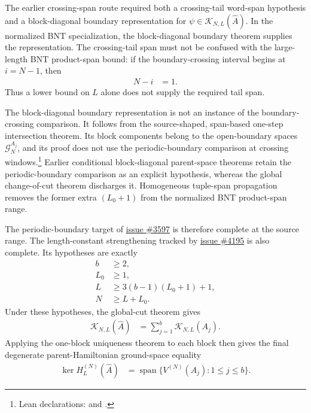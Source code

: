 \documentclass{article}
\begin{document}
The earlier crossing-span route required both a crossing-tail word-span
hypothesis and a block-diagonal boundary representation for
$\psi\in\mathcal K_{N,L}(\widehat A)$. In the normalized BNT specialization,
the block-diagonal boundary theorem supplies the representation. The
crossing-tail span must not be confused with the large-length BNT product-span
bound: if the boundary-crossing interval begins at $i=N-1$, then
\begin{align}
  N-i
    &=
    1.
  \label{eq:cpgsv21_block_diagonal_parent_ground_space_short_crossing_tail}
\end{align}
Thus a lower bound on $L$ alone does not supply the required tail span.

The block-diagonal boundary representation is not an instance of the
boundary-crossing comparison. It follows from the source-shaped, span-based
one-step intersection theorem. Its block components belong to the
open-boundary spaces $\mathcal G_N^{A_j}$, and its proof does not use the
periodic-boundary comparison at crossing windows.\footnote{Lean declarations:
and
.}
Earlier conditional block-diagonal parent-space theorems retain the
periodic-boundary comparison as an explicit hypothesis, whereas the global
change-of-cut theorem discharges it. Homogeneous tuple-span propagation removes
the former extra $(L_0+1)$ from the normalized BNT product-span range.

The periodic-boundary target of
\href{https://github.com/LionSR/TNLean/issues/3597}{issue \#3597} is therefore
complete at the source range. The length-constant strengthening tracked by
\href{https://github.com/LionSR/TNLean/issues/4195}{issue \#4195} is also
complete. Its hypotheses are exactly
\begin{align}
  b
    &\geq
    2,
  \label{eq:cpgsv21_block_diagonal_parent_ground_space_final_blocks}\\
  L_0
    &\geq
    1,
  \label{eq:cpgsv21_block_diagonal_parent_ground_space_final_injectivity}\\
  L
    &\geq
    3(b-1)(L_0+1)+1,
  \label{eq:cpgsv21_block_diagonal_parent_ground_space_final_local_length}\\
  N
    &\geq
    L+L_0.
  \label{eq:cpgsv21_block_diagonal_parent_ground_space_final_global_length}
\end{align}
Under these hypotheses, the global-cut theorem gives
\begin{align}
  \mathcal K_{N,L}(\widehat A)
    &=
    \sum_{j=1}^b\mathcal K_{N,L}(A_j).
  \label{eq:cpgsv21_block_diagonal_parent_ground_space_final_chain_decomposition}
\end{align}
Applying the one-block uniqueness theorem to each block then gives the final
degenerate parent-Hamiltonian ground-space equality
\begin{align}
  \ker H_L^{(N)}(\widehat A)
    &=
    \operatorname{span}
    \{V^{(N)}(A_j):1\leq j\leq b\}.
  \label{eq:cpgsv21_block_diagonal_parent_ground_space_final_kernel}
\end{align}
\end{document}
